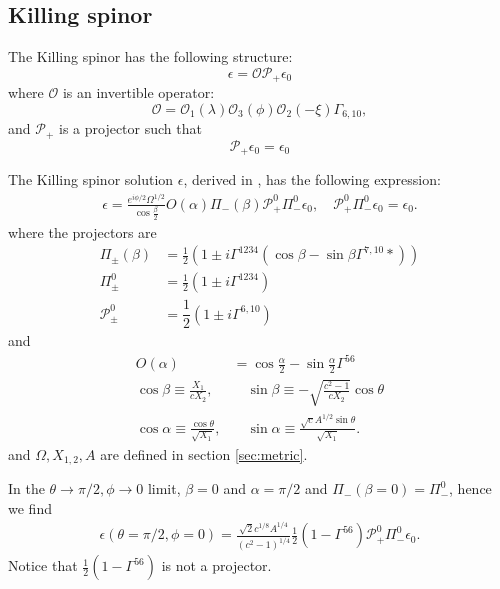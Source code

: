 \subsection{Killing spinor}
The Killing spinor has the following structure:
\begin{equation}
\epsilon = \mathcal{O} \mathcal{P}_+ \epsilon_0
\end{equation}{}
where $\mathcal{O}$ is an invertible operator:
\begin{equation}
    \mathcal{O} 
    =\mathcal{O}_1(\lambda)\mathcal{O}_3(\phi)\mathcal{O}_2(-\xi)\Gamma_{6,10},
\end{equation}{}
and $\mathcal{P}_+$ is a projector such that
\begin{equation}
    \mathcal{P}_+ \epsilon_0 =  \epsilon_0
\end{equation}{}



The Killing spinor solution $\epsilon$, derived in \cite{Pilch:2003jg}, has the following expression:
\begin{align}
\epsilon = \frac{e^{i\phi/2}\Omega^{1/2}}{\cos\frac{\beta}{2}}O(\alpha)
\Pi_-(\beta) \mathcal{P}_+^{0} \Pi^0_-\epsilon_0, \quad 
\mathcal{P}_+^{0} \Pi^0_-\epsilon_0 = \epsilon_0.
\end{align}
where the projectors are
\begin{align}
\Pi_\pm (\beta) &= 
\frac{1}{2}\left( 1 \pm i\Gamma^{1234} \left(\cos\beta - \sin \beta \Gamma^{7,10} * \right)\right)\\
\Pi_\pm^0 &= 
\frac{1}{2}\left(1 \pm i\Gamma^{1234}\right)\\
\mathcal{P}_{\pm}^{0} &=
\dfrac{1}{2} \left(1\pm i\Gamma^{6,10}\right)
\end{align}
and 
\begin{align}
O(\alpha)  &= 
\cos\frac{\alpha}{2} - \sin\frac{\alpha}{2}\Gamma^{5 6}\\
\cos\beta \equiv \frac{X_1}{c X_2}, 
&\quad
\sin\beta \equiv -\sqrt{\frac{c^2 - 1}{c X_2}}\cos\theta\\
\cos\alpha \equiv \frac{\cos\theta}{\sqrt{X_1}}, &\quad
\sin\alpha \equiv \frac{\sqrt{c}A^{1/2}\sin\theta}{\sqrt{X_1}}.
\end{align}
and $\Omega, X_{1,2}, A$ are defined in section \ref{sec:metric}.


In the  $\theta\to\pi/2, \phi \to 0$ limit, 
$\beta = 0$ and $\alpha = \pi/2$ and $\Pi_-(\beta=0) = \Pi_-^0$, hence we find
\begin{align}\label{eq: KillingSpinorClassic}
\epsilon(\theta=\pi/2,\phi=0) = \frac{\sqrt{2}c^{1/8}A^{1/4}}{(c^2-1)^{1/4}}
\frac{1}{2}(1-\Gamma^{56})\mathcal{P}_+^{0} \Pi^0_-\epsilon_0.
\end{align}
Notice that $\frac{1}{2}(1-\Gamma^{56})$ is not a projector. 